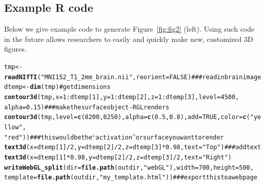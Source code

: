 \documentclass[final]{beamer}\usepackage{graphicx, color}
\makeatletter
\newcommand{\hlfunctioncall}[1]{\textcolor[rgb]{0.501960784313725,0,0.329411764705882}{\textbf{#1}}}%
\newcommand{\hlstring}[1]{\textcolor[rgb]{0.6,0.6,1}{#1}}%
\newcommand{\hlcomment}[1]{\textcolor[rgb]{0.180392156862745,0.6,0.341176470588235}{#1}}%
\newenvironment{kframe}{%
 \def\at@end@of@kframe{}%
 \ifinner\ifhmode%
  \def\at@end@of@kframe{\end{minipage}}%
  \begin{minipage}{\columnwidth}%
 \fi\fi%
 \def\FrameCommand##1{\hskip\@totalleftmargin \hskip-\fboxsep
 \colorbox{shadecolor}{##1}\hskip-\fboxsep
     \hskip-\linewidth \hskip-\@totalleftmargin \hskip\columnwidth}%
 \MakeFramed {\advance\hsize-\width
   \@totalleftmargin\z@ \linewidth\hsize
   \@setminipage}}%
 {\par\unskip\endMakeFramed%
 \at@end@of@kframe}
\newenvironment{knitrout}{}{} %
\makeatother
\begin{document}
\begin{frame}[fragile]
\begin{multicols}{2}
\subsection{Example R code}
Below we give example code to generate Figure~\ref{fig:fig2} (left).  Using such code in the future allows researchers to easily and quickly make new, customized 3D figures.
\begin{knitrout}
\color{fgcolor}\begin{kframe}
\begin{alltt}
tmp <- \hlfunctioncall{readNIfTI}(\hlstring{"MNI152_T1_2mm_brain.nii"}, reorient = FALSE)  \hlcomment{### read in brain image}
dtemp <- \hlfunctioncall{dim}(tmp)  \hlcomment{# get dimensions}
\hlfunctioncall{contour3d}(tmp, x = 1:dtemp[1], y = 1:dtemp[2], z = 1:dtemp[3], level = 4500, 
    alpha = 0.15)  \hlcomment{### make the surface object - RGL renders}
\hlfunctioncall{contour3d}(tmp, level = \hlfunctioncall{c}(8200, 8250), alpha = \hlfunctioncall{c}(0.5, 0.8), add = TRUE, color = \hlfunctioncall{c}(\hlstring{"yellow"}, 
    \hlstring{"red"}))  \hlcomment{### this would be the ``activation'' or surface you want to render}
\hlfunctioncall{text3d}(x = dtemp[1]/2, y = dtemp[2]/2, z = dtemp[3] * 0.98, text = \hlstring{"Top"})  \hlcomment{### add text}
\hlfunctioncall{text3d}(x = dtemp[1] * 0.98, y = dtemp[2]/2, z = dtemp[3]/2, text = \hlstring{"Right"})
\hlfunctioncall{writeWebGL_split}(dir = \hlfunctioncall{file.path}(outdir, \hlstring{"webGL"}), width = 700, height = 500, 
    template = \hlfunctioncall{file.path}(outdir, \hlstring{"my_template.html"}))  \hlcomment{### export this to a webpage}
\end{alltt}
\end{kframe}
\end{knitrout}





\end{multicols}
\end{frame}
\end{document}
